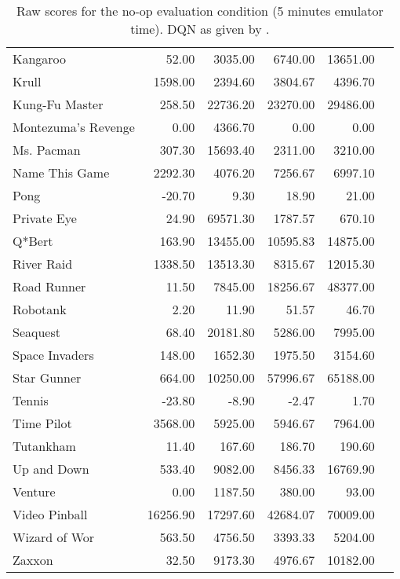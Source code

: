 \documentclass[letterpaper]{article}
\begin{document}
\begin{table*}[h]
\begin{tabular}{lrrrrr}
Kangaroo & 52.00 & 3035.00 & 6740.00 & 13651.00 \\
Krull & 1598.00 & 2394.60 & 3804.67 & 4396.70 \\
Kung-Fu Master & 258.50 & 22736.20 & 23270.00 & 29486.00 \\
Montezuma's Revenge & 0.00 & 4366.70 & 0.00 & 0.00 \\
Ms. Pacman & 307.30 & 15693.40 & 2311.00 & 3210.00 \\
Name This Game & 2292.30 & 4076.20 & 7256.67 & 6997.10 \\
Pong & -20.70 & 9.30 & 18.90 & 21.00 \\
Private Eye & 24.90 & 69571.30 & 1787.57 & 670.10 \\
Q*Bert & 163.90 & 13455.00 & 10595.83 & 14875.00 \\
River Raid & 1338.50 & 13513.30 & 8315.67 & 12015.30 \\
Road Runner & 11.50 & 7845.00 & 18256.67 & 48377.00 \\
Robotank & 2.20 & 11.90 & 51.57 & 46.70 \\
Seaquest & 68.40 & 20181.80 & 5286.00 & 7995.00 \\
Space Invaders & 148.00 & 1652.30 & 1975.50 & 3154.60 \\
Star Gunner & 664.00 & 10250.00 & 57996.67 & 65188.00 \\
Tennis & -23.80 & -8.90 & -2.47 & 1.70 \\
Time Pilot & 3568.00 & 5925.00 & 5946.67 & 7964.00 \\
Tutankham & 11.40 & 167.60 & 186.70 & 190.60 \\
Up and Down & 533.40 & 9082.00 & 8456.33 & 16769.90 \\
Venture & 0.00 & 1187.50 & 380.00 & 93.00 \\
Video Pinball & 16256.90 & 17297.60 & 42684.07 & 70009.00 \\
Wizard of Wor & 563.50 & 4756.50 & 3393.33 & 5204.00 \\
Zaxxon & 32.50 & 9173.30 & 4976.67 & 10182.00 \\
\end{tabular}
\caption{Raw scores for the no-op evaluation condition (5 minutes emulator time). DQN as given by \citet{Mnih:2015}.}
\end{table*}
\end{document}
